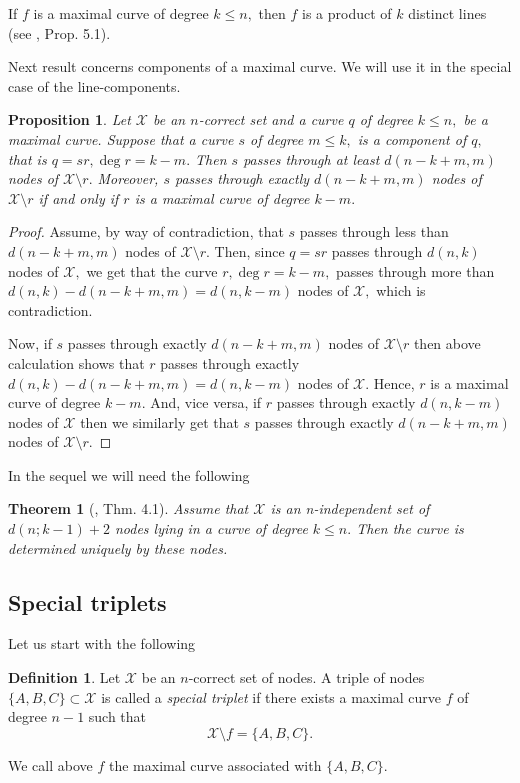\documentclass[a4paper,12pt]{article}
\newtheorem{theorem}[lemma]{Theorem}
\newtheorem{proposition}[lemma]{Proposition}
\theoremstyle{definition}
\newtheorem{definition}[lemma]{Definition}
\numberwithin{equation}{section}
\numberwithin{figure}{section}
\newcommand{\Xset}{\mathcal{X}}
\begin{document}
If $f$ is a maximal curve of degree $k\le n,$ then $f$ is a product of $k$ distinct lines (see \cite{HVV}, Prop. 5.1). 

Next result concerns components of a maximal curve. We will use it in the special case of the line-components.
\begin{proposition}\label{maxcomp} Let $\Xset$ be an $n$-correct set  and
a curve $q$ of degree $k\le n,$ be a maximal curve. Suppose that a curve $s$ of degree $m\le k,$ is a component of $q,$ that is $q=s r, \deg r=k-m.$
Then $s$ passes through  at least $d(n-k+m,m)$ nodes of $\Xset \setminus r.$ Moreover, $s$ passes through  exactly $d(n-k+m,m)$ nodes of $\Xset \setminus r$ if and only if $r$ is a maximal curve of degree $k-m.$ 
\end{proposition}

\begin{proof} Assume, by way of contradiction, that   $s$ passes through  less than $d(n-k+m,m)$ nodes of $\Xset \setminus r.$
Then, since $q=s r$ passes through $d(n,k)$ nodes of $\Xset,$ we get that the curve $r, \deg r=k-m,$ passes through more than $d(n,k)-d(n-k+m,m)=d(n,k-m)$ nodes of $\Xset,$ which is contradiction.

Now, if $s$ passes through  exactly $d(n-k+m,m)$ nodes of $\Xset \setminus r$ then above calculation shows that  $r$ passes through exactly $d(n,k)-d(n-k+m,m)=d(n,k-m)$ nodes of $\Xset.$ Hence, $r$ is a maximal curve of degree $k-m.$ And, vice versa, if $r$ passes through exactly $d(n,k-m)$ nodes of $\Xset$ then we similarly get that  $s$ passes through  exactly $d(n-k+m,m)$ nodes of $\Xset \setminus r.$  
\end{proof}

In the sequel we will need the following
\begin{theorem} [\cite{HakTor}, Thm. 4.1] \label{uncurve} Assume that $\Xset$ is an n-independent set of
$d(n; k-1)+2$ nodes lying in a curve of degree $k\le n.$ Then the curve
is determined uniquely by these nodes.
\end{theorem}

\subsection{Special triplets}

Let us start with the following
\begin{definition}
Let $\Xset$ be an $n$-correct set of nodes. A triple of nodes $\{A,B,C\}\subset\Xset$ is called a \emph{special triplet} if there exists a maximal curve $f$ of degree $n-1$ such that 
\begin{equation} \label{020} \Xset\setminus f =\{A,B,C\}.\end{equation}
\end{definition}
We call above $f$ the maximal curve associated with $\{A,B,C\}.$
\end{document}

